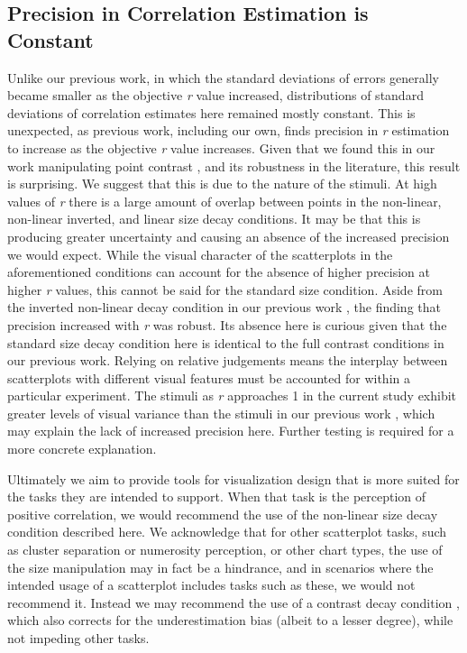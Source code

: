 \documentclass{vgtc}                          %
\begin{document}
\hypertarget{precision-in-correlation-estimation-is-constant}{%
\subsection{Precision in Correlation Estimation is Constant}\label{precision-in-correlation-estimation-is-constant}}

Unlike our previous work, in which the standard deviations of errors generally
became smaller as the objective \emph{r} value increased, distributions of standard
deviations of correlation estimates here remained mostly constant. This
is unexpected, as previous work, including our own, finds precision
in \emph{r} estimation to increase as the objective \emph{r} value increases. Given that we found
this in our work manipulating point contrast \cite{strain_2023}, and
its robustness in the literature, this result is surprising. We suggest that this
is due to the nature of the stimuli. At high values of \emph{r} there is a large amount
of overlap between points in the non-linear, non-linear inverted,
and linear size decay conditions. It may be that this
is producing greater uncertainty and causing an absence of the increased
precision we would expect. While the visual character
of the scatterplots in the aforementioned conditions can account for the absence
of higher precision at higher \emph{r} values, this cannot be said for the standard size
condition. Aside from the inverted non-linear decay condition in
our previous work \cite{strain_2023}, the finding that precision increased with \emph{r}
was robust. Its absence here is curious given that the standard size decay condition
here is identical to the full contrast conditions in our previous work.
Relying on relative judgements means the interplay between scatterplots with
different visual features must be accounted for within a particular experiment.
The stimuli as \emph{r} approaches 1 in the current study exhibit greater levels of
visual variance than the stimuli in our previous work \cite{strain_2023},
which may explain the lack of increased precision here. Further testing is required
for a more concrete explanation.

Ultimately we aim to provide tools for visualization design that is more suited for the tasks
they are intended to support. When that task is the perception of positive correlation, we would
recommend the use of the non-linear size decay condition described here. We acknowledge that
for other scatterplot tasks, such as cluster separation or numerosity perception, or
other chart types, the use of the size manipulation may in fact be a hindrance, and in scenarios
where the intended usage of a scatterplot includes tasks such as these, we would not
recommend it. Instead we may recommend the use of a contrast decay condition
\cite{strain_2023}, which also corrects for the underestimation bias (albeit to a
lesser degree), while not impeding other tasks.
\end{document}
